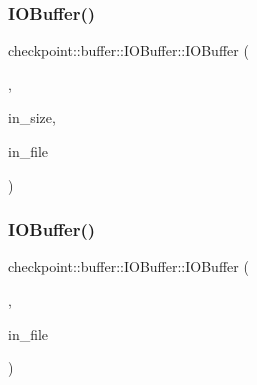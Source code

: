 \subsubsection{\texorpdfstring{I\+O\+Buffer()}{IOBuffer()}\hspace{0.1cm}{\footnotesize\ttfamily [1/2]}}
{\footnotesize\ttfamily checkpoint\+::buffer\+::\+I\+O\+Buffer\+::\+I\+O\+Buffer (\begin{DoxyParamCaption}\item[{\hyperlink{structcheckpoint_1_1buffer_1_1_i_o_buffer_1_1_write_to_file_tag}{Write\+To\+File\+Tag}}]{,  }\item[{\hyperlink{namespacecheckpoint_a083f6674da3f94c2901b18c6d238217c}{Serial\+Size\+Type} const \&}]{in\+\_\+size,  }\item[{std\+::string const \&}]{in\+\_\+file }\end{DoxyParamCaption})\hspace{0.3cm}{\ttfamily [inline]}}

\mbox{\label{structcheckpoint_1_1buffer_1_1_i_o_buffer_a6f626a1311cea9ce4240708c59be5bff}} 
\subsubsection{\texorpdfstring{I\+O\+Buffer()}{IOBuffer()}\hspace{0.1cm}{\footnotesize\ttfamily [2/2]}}
{\footnotesize\ttfamily checkpoint\+::buffer\+::\+I\+O\+Buffer\+::\+I\+O\+Buffer (\begin{DoxyParamCaption}\item[{\hyperlink{structcheckpoint_1_1buffer_1_1_i_o_buffer_1_1_read_from_file_tag}{Read\+From\+File\+Tag}}]{,  }\item[{std\+::string const \&}]{in\+\_\+file }\end{DoxyParamCaption})\hspace{0.3cm}{\ttfamily [inline]}}

\mbox{\label{structcheckpoint_1_1buffer_1_1_i_o_buffer_a7ff7df5a133119cb831e27d00b2a0ec8}} 
